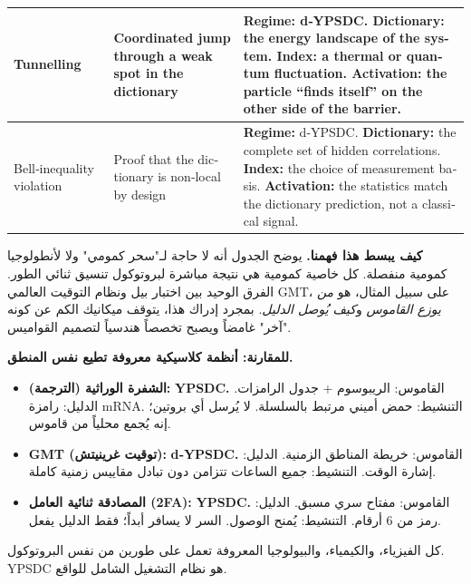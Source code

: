 \documentclass[12pt,a4paper]{article}
\theoremstyle{remark}
\begin{document}
\begin{otherlanguage}{english}
\begin{table}[htbp]
\begin{tabular}{p{2.5cm} p{4.8cm} p{7.8cm}}
				\midrule
				Tunnelling &
				Coordinated jump through a weak spot in the dictionary &
				\textbf{Regime:} d‑YPSDC. \newline
				\textbf{Dictionary:} the energy landscape of the system. \newline
				\textbf{Index:} a thermal or quantum fluctuation. \newline
				\textbf{Activation:} the particle “finds itself” on the other side of the barrier. \\
				\midrule
				Bell‑inequality violation &
				Proof that the dictionary is non‑local by design &
				\textbf{Regime:} d‑YPSDC. \newline
				\textbf{Dictionary:} the complete set of hidden correlations. \newline
				\textbf{Index:} the choice of measurement basis. \newline
				\textbf{Activation:} the statistics match the dictionary prediction, not a classical signal. \\
				\bottomrule
			\end{tabular}
		\end{table}
	\end{otherlanguage}
	
	\noindent
	\textbf{كيف يبسط هذا فهمنا.}
	يوضح الجدول أنه لا حاجة لـ"سحر كمومي" ولا لأنطولوجيا كمومية منفصلة. كل خاصية كمومية هي نتيجة مباشرة لبروتوكول تنسيق ثنائي الطور. الفرق الوحيد بين اختبار بيل ونظام التوقيت العالمي GMT، على سبيل المثال، هو \emph{من يوزع القاموس} و\emph{كيف يُوصل الدليل}. بمجرد إدراك هذا، يتوقف ميكانيك الكم عن كونه "آخر" غامضاً ويصبح تخصصاً هندسياً لتصميم القواميس.
	
	\textbf{للمقارنة: أنظمة كلاسيكية معروفة تطيع نفس المنطق.}
	\begin{itemize}
		\item \textbf{الشفرة الوراثية (الترجمة):} \textbf{YPSDC.} القاموس: الريبوسوم + جدول الرامزات. الدليل: رامزة mRNA. التنشيط: حمض أميني مرتبط بالسلسلة. لا يُرسل أي بروتين؛ إنه يُجمع محلياً من قاموس.
		\item \textbf{GMT (توقيت غرينيتش):} \textbf{d‑YPSDC.} القاموس: خريطة المناطق الزمنية. الدليل: إشارة الوقت. التنشيط: جميع الساعات تتزامن دون تبادل مقاييس زمنية كاملة.
		\item \textbf{المصادقة ثنائية العامل (2FA):} \textbf{YPSDC.} القاموس: مفتاح سري مسبق. الدليل: رمز من 6 أرقام. التنشيط: يُمنح الوصول. السر لا يسافر أبداً؛ فقط الدليل يفعل.
	\end{itemize}
	
	كل الفيزياء، والكيمياء، والبيولوجيا المعروفة تعمل على طورين من نفس البروتوكول. YPSDC هو نظام التشغيل الشامل للواقع.
	
\end{document}
